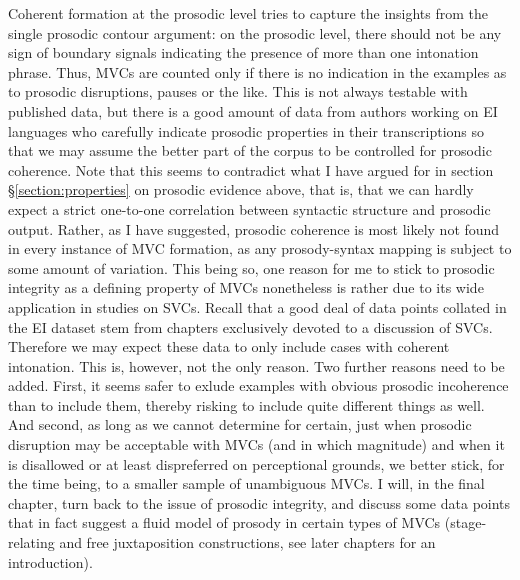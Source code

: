 Coherent formation at the prosodic level tries to capture the insights from the single prosodic contour argument: on the prosodic level, there should not be any sign of boundary signals indicating the presence of more than one intonation phrase. Thus, MVCs are counted only if there is no indication in the examples as to prosodic disruptions, pauses or the like. This is not always testable with published data, but there is a good amount of data from authors working on EI languages who carefully indicate prosodic properties in their transcriptions so that we may assume the better part of the corpus to be controlled for prosodic coherence. Note that this seems to contradict what I have argued for in section §\ref{section:properties} on prosodic evidence above, that is, that we can hardly expect a strict one-to-one correlation between syntactic structure and prosodic output. Rather, as I have suggested, prosodic coherence is most likely not found in every instance of MVC formation, as any prosody-syntax mapping is subject to some amount of variation. This being so, one reason for me to stick to prosodic integrity as a defining property of MVCs nonetheless is rather due to its wide application in studies on SVCs. Recall that a good deal of data points collated in the EI dataset stem from chapters exclusively devoted to a discussion of SVCs. Therefore we may expect these data to only include cases with coherent intonation. This is, however, not the only reason. Two further reasons need to be added. First, it seems safer to exlude examples with obvious prosodic incoherence than to include them, thereby risking to include quite different things as well. And second, as long as we cannot determine for certain, just when prosodic disruption may be acceptable with MVCs (and in which magnitude) and when it is disallowed or at least dispreferred on perceptional grounds, we better stick, for the time being, to a smaller sample of unambiguous MVCs. I will, in the final chapter, turn back to the issue of prosodic integrity, and discuss some data points that in fact suggest a fluid model of prosody in certain types of MVCs (stage-relating and free juxtaposition constructions, see later chapters for an introduction).

